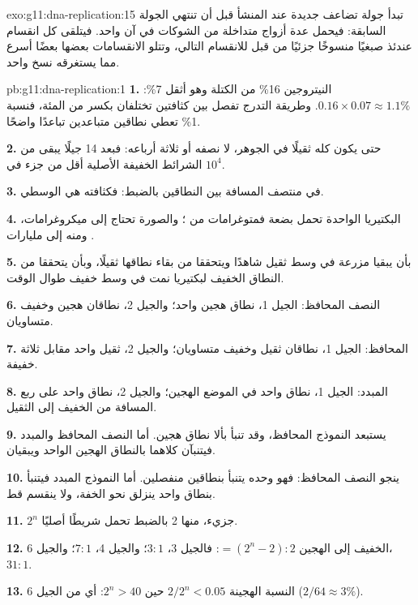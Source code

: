 \begin{solution}{exo:g11:dna-replication:15}
تبدأ جولة تضاعف جديدة عند المنشأ قبل أن تنتهي الجولة السابقة: فيحمل
 عدة أزواج متداخلة من الشوكات في آن واحد. فيتلقى كل انقسام
عندئذ صبغيًا منسوخًا جزئيًا من قبل للانقسام التالي، وتتلو الانقسامات
بعضها بعضًا أسرع مما يستغرقه نسخ واحد.
\end{solution}

\begin{solution}{pb:g11:dna-replication:1}
\textbf{1.} النيتروجين 16\% من الكتلة وهو أثقل 7\%:
$0.16 \times 0.07 \approx 1.1\%$. وطريقة التدرج تفصل بين كثافتين
تختلفان بكسر من المئة، فنسبة 1\% تعطي نطاقين متباعدين تباعدًا واضحًا.

\textbf{2.} حتى يكون  كله ثقيلًا في الجوهر، لا نصفه أو ثلاثة
أرباعه: فبعد 14 جيلًا يبقى من الشرائط الخفيفة الأصلية أقل من جزء في
$10^4$.

\textbf{3.} في منتصف المسافة بين النطاقين بالضبط: فكثافته هي الوسطي.

\textbf{4.} البكتيريا الواحدة تحمل بضعة فمتوغرامات من ؛ والصورة
تحتاج إلى ميكروغرامات، ومنه إلى مليارات .

\textbf{5.} بأن يبقيا مزرعة في وسط ثقيل شاهدًا ويتحققا من بقاء نطاقها
ثقيلًا، وبأن يتحققا من النطاق الخفيف لبكتيريا نمت في وسط خفيف طوال
الوقت.

\textbf{6.} النصف المحافظ: الجيل 1، نطاق هجين واحد؛ والجيل 2، نطاقان
هجين وخفيف متساويان.

\textbf{7.} المحافظ: الجيل 1، نطاقان ثقيل وخفيف متساويان؛ والجيل 2،
ثقيل واحد مقابل ثلاثة خفيفة.

\textbf{8.} المبدد: الجيل 1، نطاق واحد في الموضع الهجين؛ والجيل 2،
نطاق واحد على ربع المسافة من الخفيف إلى الثقيل.

\textbf{9.} يستبعد النموذج المحافظ، وقد تنبأ بألا نطاق هجين. أما
النصف المحافظ والمبدد فيتنبآن كلاهما بالنطاق الهجين الواحد ويبقيان.

\textbf{10.} ينجو النصف المحافظ: فهو وحده يتنبأ بنطاقين منفصلين. أما
النموذج المبدد فيتنبأ بنطاق واحد ينزلق نحو الخفة، ولا ينقسم قط.

\textbf{11.} $2^n$ جزيء، منها 2 بالضبط تحمل شريطًا أصليًا.

\textbf{12.} الخفيف إلى الهجين $= (2^n - 2) : 2$: فالجيل 3، $3:1$؛
والجيل 4، $7:1$؛ والجيل 6، $31:1$.

\textbf{13.} النسبة الهجينة $2/2^n < 0.05$ حين $2^n > 40$: أي من
الجيل 6 ($2/64 \approx 3\%$).


\end{solution}
